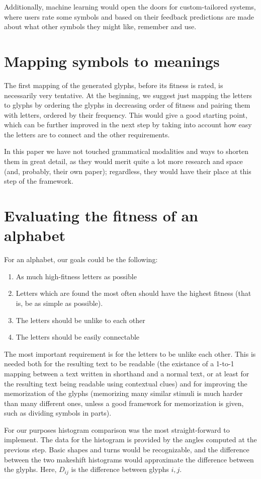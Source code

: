 \documentclass[conference]{IEEEtran}
\begin{document}
Additionally, machine learning would open the doors for custom-tailored systems, where users rate some symbols and based on their feedback predictions are made about what other symbols they might like, remember and use. 
\section{Mapping symbols to meanings}
The first mapping of the generated glyphs, before its fitness is rated, is necessarily very tentative. At the beginning, we suggest just mapping the letters to glyphs by ordering the glyphs in decreasing order of fitness and pairing them with letters, ordered by their frequency. This would give a good starting point, which can be further improved in the next step by taking into account how easy the letters are to connect and the other requirements. 

In this paper we have not touched grammatical modalities and ways to shorten them in great detail, as they would merit quite a lot more research and space (and, probably, their own paper); regardless, they would have their place at this step of the framework. 
\section{Evaluating the fitness of an alphabet}
For an alphabet, our goals could be the following:
\begin{enumerate}
        \item As much high-fitness letters as possible
        \item Letters which are found the most often should have the highest fitness (that is, be as simple as possible).
        \item The letters should be unlike to each other
        \item The letters should be easily connectable
\end{enumerate}

The most important requirement is for the letters to be unlike each other. This is needed both for the resulting text to be readable (the existance of a 1-to-1 mapping between a text written in shorthand and a normal text, or at least for the resulting text being readable using contextual clues) and for improving the memorization of the glyphs (memorizing many similar stimuli is much harder than many different ones, unless a good framework for memorization is given, such as dividing symbols in parts). 

For our purposes histogram comparison was the most straight-forward to implement. The data for the histogram is provided by the angles computed at the previous step. Basic shapes and turns would be recognizable, and the difference between the two makeshift histograms would approximate the difference between the glyphs. Here, \(D_{ij}\) is the difference between glyphs \(i, j\).
\end{document}
